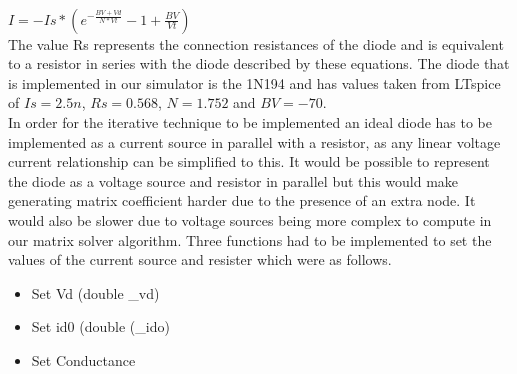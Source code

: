 \documentclass{article}
\begin{document}
\\$I = -Is*(e^{-\frac{BV+Vd}{N*Vt}}-1+\frac{BV}{Vt})$\\\bigbreak
The value Rs represents the connection resistances of the diode and is equivalent to a resistor in series with the diode described by these equations. The diode that is implemented in our simulator is the 1N194 and has values taken from LTspice of $Is=2.5n$, $Rs=0.568$, $N=1.752$ and $BV = -70$.  
\\
In order for the iterative technique to be implemented an ideal diode has to be implemented as a current source in parallel with a resistor, as any linear voltage current relationship can be simplified to this. It would be possible to represent the diode as a voltage source and resistor in parallel but this would make generating matrix coefficient harder due to the presence of an extra node. It would also be slower due to voltage sources being more complex to compute in our matrix solver algorithm. Three functions had to be implemented to set the values of the current source and resister which were as follows.
\begin{itemize}
    \item Set Vd (double \_vd)
    \item Set id0 (double (\_ido)
    \item Set Conductance
\end{itemize}
\end{document}
